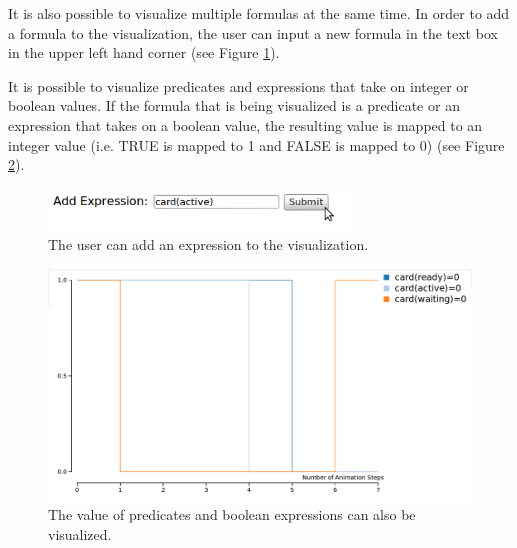 It is also possible to visualize multiple formulas at the same time. In order to add a formula to the visualization, the user can input a new formula in the text box in the upper left hand corner (see Figure \ref{timeVsValueUI}).

It is possible to visualize predicates and expressions that take on integer or boolean values. If the formula that is being visualized is a predicate or an expression that takes on a boolean value, the resulting value is mapped to an integer value (i.e. TRUE is mapped to 1 and FALSE is mapped to 0) (see Figure \ref{valueBool}).

\begin{center}
\begin{figure}[h!]
\centering
\includegraphics[width=8cm]{bilder/timeVValueUI.png}
\caption{The user can add an expression to the visualization.}
\label{timeVsValueUI}
\end{figure}
\end{center}

\begin{center}
\begin{figure}[h!]
\centering
\includegraphics[width=14cm]{bilder/valueBool.png}
\caption{The value of predicates and boolean expressions can also be visualized.}
\label{valueBool}
\end{figure}
\end{center}